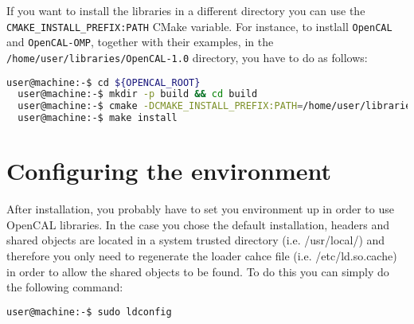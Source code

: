 If you want to install the libraries in a different directory you can
use the \texttt{CMAKE\_INSTALL\_PREFIX:PATH} CMake variable. For
instance, to instlall \verb'OpenCAL' and \verb'OpenCAL-OMP', together
with their examples, in the \texttt{/home/user/libraries/OpenCAL-1.0}
directory, you have to do as follows:

\begin{lstlisting}[numbers=none,language=bash,label={ch:quickstart:sudoinstall}]
  user@machine:-$ cd ${OPENCAL_ROOT}
  user@machine:-$ mkdir -p build && cd build
  user@machine:-$ cmake -DCMAKE_INSTALL_PREFIX:PATH=/home/user/libraries/OpenCAL-1.0 -DBUILD_EXAMPLES=ON -DBUILD_OPENCAL_OMP=ON ../
  user@machine:-$ make install
\end{lstlisting}





\section{Configuring the environment}
After installation, you probably have to set you environment up in
order to use OpenCAL libraries. In the case you chose the default
installation, headers and shared objects are located in a system
trusted directory (i.e. /usr/local/) and therefore you only need to
regenerate the loader cahce file (i.e. /etc/ld.so.cache) in order to
allow the shared objects to be found. To do this you can simply
do the following command:

\begin{lstlisting}[numbers=none,language=bash,label={ch:quickstart:sudoinstall}]
  user@machine:-$ sudo ldconfig
\end{lstlisting}

